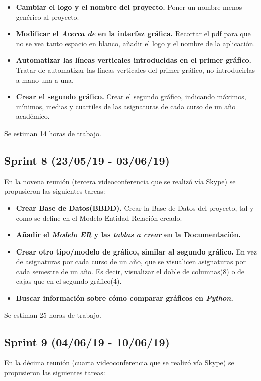 \begin{itemize}
\item
\textbf{Cambiar el logo y el nombre del proyecto.} Poner un nombre menos genérico al proyecto.
\item
\textbf{Modificar el \emph{Acerca de} en la interfaz gráfica.} Recortar el pdf para que no se vea tanto espacio en blanco, añadir el logo y el nombre de la aplicación.
\item
\textbf{Automatizar las líneas verticales introducidas en el primer gráfico.} Tratar de automatizar las líneas verticales del primer gráfico, no introducirlas a mano una a una.
\item
\textbf{Crear el segundo gráfico.} Crear el segundo gráfico, indicando máximos, mínimos, medias y cuartiles de las asignaturas de cada curso de un año académico.
\end{itemize}

Se estiman 14 horas de trabajo.

\subsection{Sprint 8 (23/05/19 - 03/06/19)}
En la novena reunión (tercera videoconferencia que se realizó vía Skype) se propusieron las siguientes tareas:

\begin{itemize}
\item
\textbf{Crear Base de Datos(BBDD).} Crear la Base de Datos del proyecto, tal y como se define en el Modelo Entidad-Relación creado.
\item
\textbf{Añadir el \emph{Modelo ER} y las \emph{tablas a crear} en la Documentación.}
\item
\textbf{Crear otro tipo/modelo de gráfico, similar al segundo gráfico.} En vez de asignaturas por cada curso de un año, que se visualicen asignaturas por cada semestre de un año. Es decir, visualizar el doble de columnas(8) o de cajas que en el segundo gráfico(4).
\item
\textbf{Buscar información sobre cómo comparar gráficos en \emph{Python}.}
\end{itemize}

Se estiman 25 horas de trabajo.

\subsection{Sprint 9 (04/06/19 - 10/06/19)}
En la décima reunión (cuarta videoconferencia que se realizó vía Skype) se propusieron las siguientes tareas:

